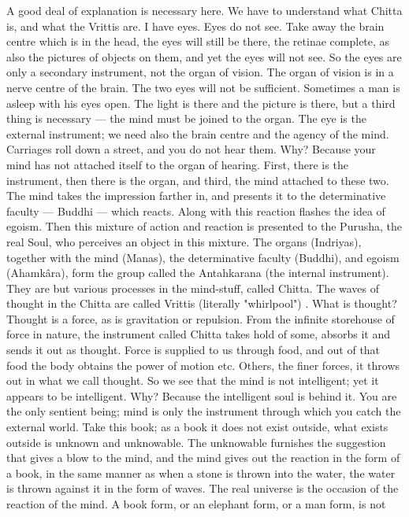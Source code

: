 A good deal of explanation is necessary here. We have to
understand what Chitta is, and what the Vrittis are. I have eyes. Eyes
do not see. Take away the brain centre which is in the head, the eyes
will still be there, the retinae complete, as also the pictures of
objects on them, and yet the eyes will not see. So the eyes are only a
secondary instrument, not the organ of vision. The organ of vision is
in a nerve centre of the brain. The two eyes will not be sufficient.
Sometimes a man is asleep with his eyes open. The light is there and
the picture is there, but a third thing is necessary — the mind must be
joined to the organ. The eye is the external instrument; we need also
the brain centre and the agency of the mind. Carriages roll down a
street, and you do not hear them. Why? Because your mind has not
attached itself to the organ of hearing. First, there is the
instrument, then there is the organ, and third, the mind attached to
these two. The mind takes the impression farther in, and presents it to
the determinative faculty — Buddhi — which reacts. Along with this
reaction flashes the idea of egoism. Then this mixture of action and
reaction is presented to the
Purusha, the real Soul, who perceives an object in this mixture. The
organs (Indriyas), together with the mind (Manas), the determinative
faculty (Buddhi), and egoism (Ahamkâra), form the group called the
Antahkarana (the internal instrument). They are but various processes
in the mind-stuff, called Chitta. The waves of thought in the Chitta
are called Vrittis (literally "whirlpool") . What is thought? Thought
is a force, as is gravitation or repulsion. From the infinite
storehouse of force in nature, the instrument called Chitta takes hold
of some, absorbs it and sends it out as thought. Force is supplied to
us through food, and out of that food the body obtains the power of
motion etc. Others, the finer forces, it throws out in what we call
thought. So we see that the mind is not intelligent; yet it appears to
be intelligent. Why? Because the intelligent soul is behind it. You are
the only sentient being; mind is only the instrument through which you
catch the external world. Take this book; as a book it does not exist
outside, what exists outside is unknown and unknowable. The unknowable
furnishes the suggestion that gives a blow to the mind, and the mind
gives out the reaction in the form of a book, in the same manner as
when a stone is thrown into the water, the water is thrown against it
in the form of waves. The real universe is the occasion of the reaction
of the mind. A book form, or an elephant form, or a man form, is not
